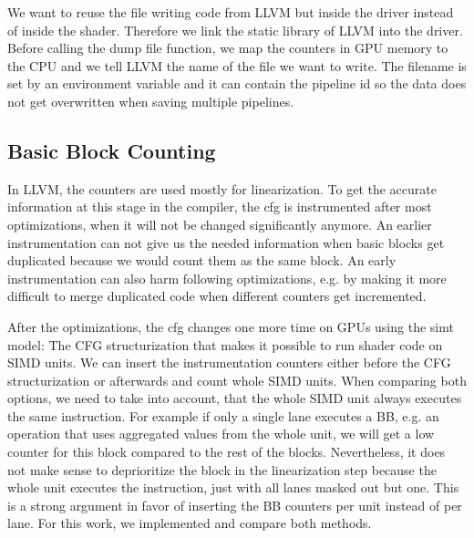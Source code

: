 We want to reuse the file writing code from LLVM but inside the driver instead of inside the shader.
Therefore we link the static library of LLVM into the driver.
Before calling the dump file function, we map the counters in GPU memory to the CPU and we tell LLVM the name of the file we want to write.
The filename is set by an environment variable and it can contain the pipeline id so the data does not get overwritten when saving multiple pipelines.

\subsection{Basic Block Counting}
\label{sub:design_counters}
In LLVM, the counters are used mostly for linearization. To get the accurate information at this stage in the compiler, the \gls{cfg} is instrumented after most optimizations, when it will not be changed significantly anymore.
An earlier instrumentation can not give us the needed information when basic blocks get duplicated because we would count them as the same block. An early instrumentation can also harm following optimizations, e.g. by making it more difficult to merge duplicated code when different counters get incremented.

After the optimizations, the \gls{cfg} changes one more time on GPUs using the \gls{simt} model: The CFG structurization that makes it possible to run shader code on SIMD units.
We can insert the instrumentation counters either before the CFG structurization or afterwards and count whole SIMD units. When comparing both options, we need to take into account, that the whole SIMD unit always executes the same instruction.
For example if only a single lane executes a BB, e.g. an operation that uses aggregated values from the whole unit, we will get a low counter for this block compared to the rest of the blocks. Nevertheless, it does not make sense to deprioritize the block in the linearization step because the whole unit executes the instruction, just with all lanes masked out but one.
This is a strong argument in favor of inserting the BB counters per unit instead of per lane. For this work, we implemented and compare both methods.

